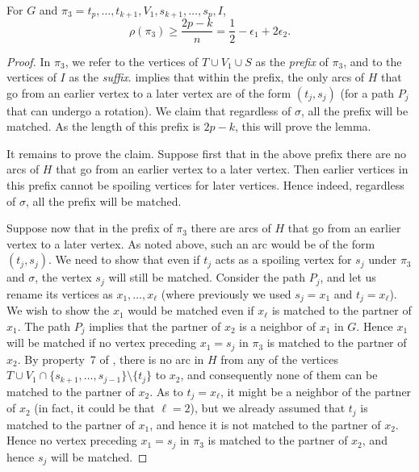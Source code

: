 \begin{lemma}
	\label{lem:sort1}
For $G$ and $\pi_3 = t_p, \ldots, t_{k+1}, V_1, s_{k+1}, \ldots, s_p, I$,
$$\rho(\pi_3) \ge \frac{2p - k}{n} = \frac{1}{2} - \epsilon_1 + 2\epsilon_2.$$
\end{lemma}

\begin{proof}
	In $\pi_3$, we refer to the vertices of $T \cup V_1 \cup S$ as the \emph{prefix} of $\pi_3$, and to the vertices of $I$ as the \emph{suffix}.  implies that within the prefix, the only arcs of $H$ that go from an earlier vertex to a later vertex are of the form $(t_j,s_j)$ (for a path $P_j$ that can undergo a rotation). We claim that regardless of $\sigma$, all the prefix will be matched. As the length of this prefix is $2p - k$, this will prove the lemma.
	
	It remains to prove the claim. Suppose first that in the above prefix there are no arcs of $H$ that go from an earlier vertex to a later vertex. Then earlier vertices
	in this prefix cannot be spoiling vertices for later vertices. Hence indeed,
	regardless of $\sigma$, all the prefix will be matched.
	
	Suppose now that in the prefix of $\pi_3$ there are arcs of $H$ that go from an earlier vertex to a later vertex. As noted above, such an arc would be of the form $(t_j,s_j)$. We need to show that even if $t_j$ acts as a spoiling vertex for $s_j$ under $\pi_3$ and $\sigma$, the vertex $s_j$ will still be matched. Consider the path $P_j$, and let us rename its vertices as $x_1, \ldots, x_{\ell}$ (where previously we used $s_j = x_1$ and $t_j = x_{\ell}$). We wish to show the $x_1$ would be matched even if $x_{\ell}$ is matched to the partner of $x_1$. The path $P_j$ implies that the partner of $x_2$ is a neighbor of $x_1$ in $G$. Hence $x_1$ will be matched if no vertex preceding $x_1 = s_j$ in $\pi_3$ is matched to the partner of $x_2$. By property~7 of , there is no arc in $H$ from any of the vertices $T \cup V_1 \cap \{s_{k+1}, \ldots, s_{j-1}\} \setminus \{t_j\}$ to $x_2$, and consequently none of them can be matched to the partner of $x_2$. As to $t_j = x_{\ell}$, it might be a neighbor of the partner of $x_2$ (in fact, it could be that $\ell = 2$), but we already assumed that $t_j$ is matched to the partner of $x_1$, and hence it is not matched to the partner of $x_2$. Hence no vertex preceding $x_1 = s_j$ in $\pi_3$ is matched to the partner of $x_2$, and hence $s_j$ will be matched.
\end{proof}

